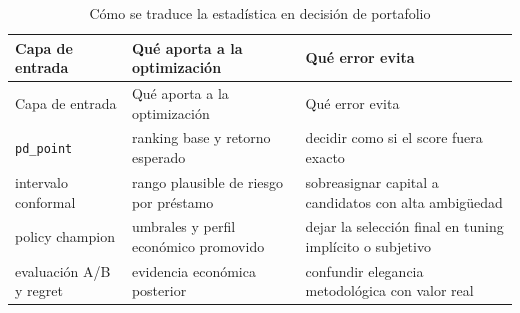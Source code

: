 \documentclass[
  spanish,
  11pt,
  letterpaper,
]{scrbook}
\theoremstyle{plain}
\theoremstyle{remark}
\begin{document}
\begin{longtable}[]{@{}
  >{\raggedright\arraybackslash}p{}
  >{\raggedright\arraybackslash}p{}
  >{\raggedright\arraybackslash}p{}@{}}
\caption{Cómo se traduce la estadística en decisión de
portafolio}\label{tbl-portfolio-inputs}\tabularnewline
\toprule\noalign{}
\begin{minipage}[b]{\linewidth}\raggedright
Capa de entrada
\end{minipage} & \begin{minipage}[b]{\linewidth}\raggedright
Qué aporta a la optimización
\end{minipage} & \begin{minipage}[b]{\linewidth}\raggedright
Qué error evita
\end{minipage} \\
\midrule\noalign{}
\endfirsthead
\toprule\noalign{}
\begin{minipage}[b]{\linewidth}\raggedright
Capa de entrada
\end{minipage} & \begin{minipage}[b]{\linewidth}\raggedright
Qué aporta a la optimización
\end{minipage} & \begin{minipage}[b]{\linewidth}\raggedright
Qué error evita
\end{minipage} \\
\midrule\noalign{}
\endhead
\bottomrule\noalign{}
\endlastfoot
\texttt{pd\_point} & ranking base y retorno esperado & decidir como si
el score fuera exacto \\
intervalo conformal & rango plausible de riesgo por préstamo &
sobreasignar capital a candidatos con alta ambigüedad \\
policy champion & umbrales y perfil económico promovido & dejar la
selección final en tuning implícito o subjetivo \\
evaluación A/B y regret & evidencia económica posterior & confundir
elegancia metodológica con valor real \\
\end{longtable}
\end{document}
